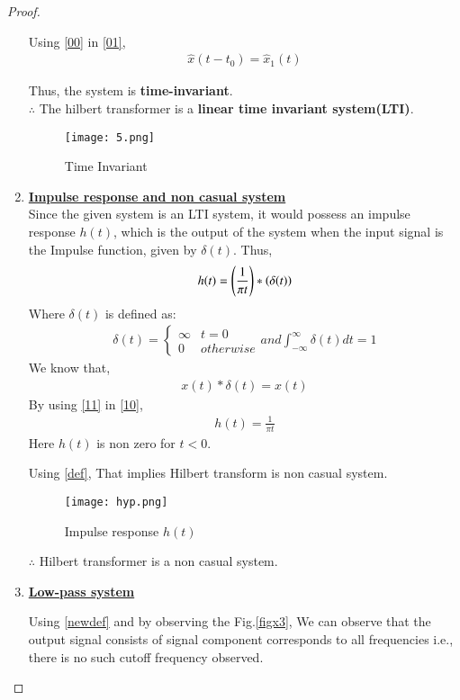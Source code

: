 \documentclass[journal,12pt,twocolumn]{IEEEtran}
\begin{document}
\begin{proof}
\begin{enumerate}
Using \eqref{00} in \eqref{01},
\begin{align}
    \hat{x}(t-t_0) =\hat{x}_1(t) 
\end{align}

Thus, the system is \textbf{time-invariant}.\\
$\therefore$ The hilbert transformer is a \textbf{linear time invariant system(LTI)}.

 \begin{figure}[!htp]
\centering
 \texttt{[image: 5.png]}
 \caption{Time Invariant}
 \end{figure}

\item {\textbf{\underline{Impulse response and non casual system}}}\\
Since the given system is an LTI system, it would possess an impulse response $h(t)$, which is the output of the system when the input signal is the Impulse function, given by $\delta(t)$. Thus,
\begin{align}
    h(t) =\left(\frac{1}{\pi t}\right)\ast \left(\delta(t)\right)\label{10}
\end{align}
Where $\delta(t)$ is defined as:
\begin{align}
\nonumber    \delta(t) = 
    \begin{cases}
\infty & t = 0\\
0 & otherwise
\end{cases}
and \int_{-\infty}^\infty \delta(t)dt  = 1
\end{align}
We know that,
\begin{align}
{x(t)}\ast {\delta(t)}=x(t)\label{11}
\end{align}
By using \eqref{11} in \eqref{10},
\begin{align}
    h(t) = \frac{1}{\pi t}
    \label{H}
\end{align}
Here $h(t)$ is non zero for $t<0$.

Using \eqref{def}, That implies Hilbert transform is non casual system.
 \begin{figure}[!htp]
\centering
 \texttt{[image: hyp.png]}
 \caption{Impulse response $h(t)$}
 \end{figure}
 
$\therefore$ Hilbert transformer is a non casual system.


\item {\textbf{\underline{Low-pass system}}}

Using \eqref{newdef} and by observing the Fig.\ref{figx3}, We can observe that the output signal consists of signal component corresponds to all frequencies i.e., there is no such cutoff frequency observed. 


\end{enumerate}
\end{proof}
\end{document}
